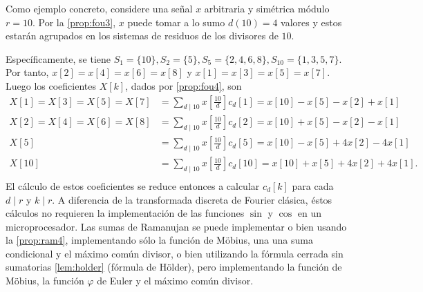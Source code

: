 \begin{example}
Como ejemplo concreto, considere una señal $x$ arbitraria y simétrica módulo $r=10$. Por la \cref{prop:fou3}, $x$ puede tomar a lo sumo $d(10)=4$ valores y estos estarán agrupados en los sistemas de residuos de los divisores de $10$.
\bigskip

\thispagestyle{easter2}

Específicamente, se tiene $S_1 = \{ 10 \}, S_2 = \{ 5 \}, S_5 = \{ 2, 4, 6, 8 \}, S_{10} = \{ 1, 3, 5, 7 \}$. Por tanto, $x[2]=x[4]=x[6]=x[8]$ y $x[1]=x[3]=x[5]=x[7]$. Luego los coeficientes $X[k]$, dados por \ref{prop:fou4}, son
\begin{align*}
    X[1] = X[3] = X[5] = X[7] & = \sum_{d \mid 10} x \left[ \frac{10}{d} \right] c_d[1] = x[10] - x[5] - x[2] + x[1] \\
    X[2] = X[4] = X[6] = X[8] & = \sum_{d \mid 10} x \left[ \frac{10}{d} \right] c_d[2] = x[10] + x[5] - x[2] - x[1] \\
    X[5] & = \sum_{d \mid 10} x \left[ \frac{10}{d} \right] c_d[5] = x[10] - x[5] + 4 x[2] - 4 x[1] \\
    X[10] & = \sum_{d \mid 10} x \left[ \frac{10}{d} \right] c_d[10] = x[10] + x[5] + 4 x[2] + 4 x[1]. \\
\end{align*}
El cálculo de estos coeficientes se reduce entonces a calcular $c_d[k]$ para cada $d \mid r$ y $k \mid r$. A diferencia de la transformada discreta de Fourier clásica, éstos cálculos no requieren la implementación de las funciones $\sin$ y $\cos$ en un microprocesador. Las sumas de Ramanujan se puede implementar o bien usando la \cref{prop:ram4}, implementando sólo la función de Möbius, una una suma condicional y el máximo común divisor, o bien utilizando la fórmula cerrada sin sumatorias \ref{lem:holder} (fórmula de Hölder), pero implementando la función de Möbius, la función $\varphi$ de Euler y el máximo común divisor.
\end{example}

